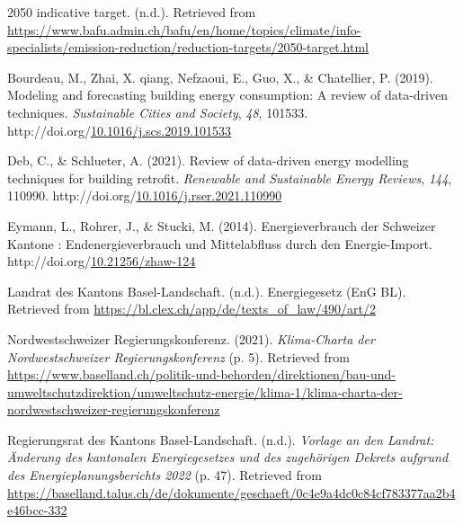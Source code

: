\documentclass[
  letterpaper,
  DIV=11,
  numbers=noendperiod]{scrreprt}
\newlength{\cslhangindent}
\newlength{\cslentryspacingunit} %
\newenvironment{CSLReferences}[2] %
 {%
  \setlength{\parindent}{0pt}
  \ifodd #1
  \let\oldpar\par
  \def\par{\hangindent=\cslhangindent\oldpar}
  \fi
  \setlength{\parskip}{#2\cslentryspacingunit}
 }%
 {}
\begin{document}
\hypertarget{refs}{}
\begin{CSLReferences}{1}{0}
\leavevmode{}%
2050 indicative target. (n.d.). Retrieved from
\url{https://www.bafu.admin.ch/bafu/en/home/topics/climate/info-specialists/emission-reduction/reduction-targets/2050-target.html}

\leavevmode{}%
Bourdeau, M., Zhai, X. qiang, Nefzaoui, E., Guo, X., \& Chatellier, P.
(2019). Modeling and forecasting building energy consumption: A review
of data-driven techniques. \emph{Sustainable Cities and Society},
\emph{48}, 101533.
http://doi.org/\href{https://doi.org/10.1016/j.scs.2019.101533}{10.1016/j.scs.2019.101533}

\leavevmode{}%
Deb, C., \& Schlueter, A. (2021). Review of data-driven energy modelling
techniques for building retrofit. \emph{Renewable and Sustainable Energy
Reviews}, \emph{144}, 110990.
http://doi.org/\href{https://doi.org/10.1016/j.rser.2021.110990}{10.1016/j.rser.2021.110990}

\leavevmode{}%
Eymann, L., Rohrer, J., \& Stucki, M. (2014). Energieverbrauch der
Schweizer Kantone : Endenergieverbrauch und Mittelabfluss durch den
Energie-Import.
http://doi.org/\href{https://doi.org/10.21256/zhaw-124}{10.21256/zhaw-124}

\leavevmode{}%
Landrat des Kantons Basel-Landschaft. (n.d.). Energiegesetz (EnG BL).
Retrieved from \url{https://bl.clex.ch/app/de/texts_of_law/490/art/2}

\leavevmode{}%
Nordwestschweizer Regierungskonferenz. (2021). \emph{Klima-Charta der
Nordwestschweizer Regierungskonferenz} (p. 5). Retrieved from
\url{https://www.baselland.ch/politik-und-behorden/direktionen/bau-und-umweltschutzdirektion/umweltschutz-energie/klima-1/klima-charta-der-nordwestschweizer-regierungskonferenz}

\leavevmode{}%
Regierungsrat des Kantons Basel-Landschaft. (n.d.). \emph{Vorlage an den
Landrat: Änderung des kantonalen Energiegesetzes und des zugehörigen
Dekrets aufgrund des Energieplanungsberichts 2022} (p. 47). Retrieved
from
\url{https://baselland.talus.ch/de/dokumente/geschaeft/0c4e9a4dc0c84cf783377aa2b4e46bcc-332}


\end{CSLReferences}
\end{document}
